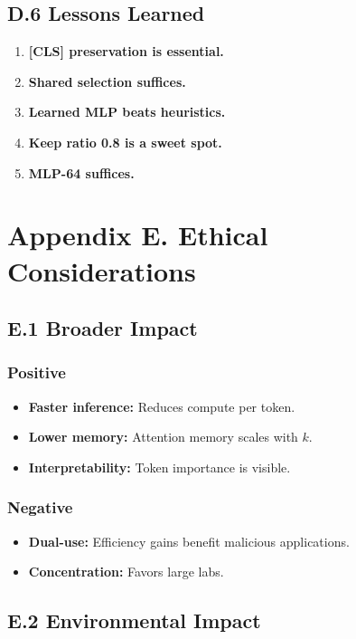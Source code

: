 {\subsection{D.6 Lessons Learned}

\begin{enumerate}
\item \textbf{[CLS] preservation is essential.}
\item \textbf{Shared selection suffices.}
\item \textbf{Learned MLP beats heuristics.}
\item \textbf{Keep ratio 0.8 is a sweet spot.}
\item \textbf{MLP-64 suffices.}

\end{enumerate}



\section{Appendix E. Ethical Considerations}

\subsection{E.1 Broader Impact}

\subsubsection{Positive}
\begin{itemize}
\item \textbf{Faster inference:} Reduces compute per token.
\item \textbf{Lower memory:} Attention memory scales with $k$.
\item \textbf{Interpretability:} Token importance is visible.

\end{itemize}
\subsubsection{Negative}
\begin{itemize}
\item \textbf{Dual-use:} Efficiency gains benefit malicious applications.
\item \textbf{Concentration:} Favors large labs.

\end{itemize}
\subsection{E.2 Environmental Impact}

}

